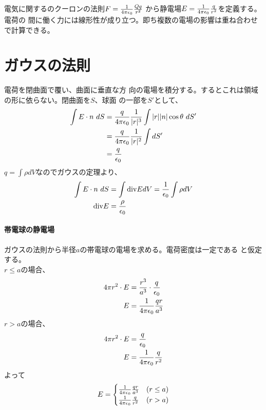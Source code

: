     電気に関するのクーロンの法則$F=\frac{1}{4\pi\epsilon_0}\frac{Qq}{r^2}$
    から静電場$E=\frac{1}{4\pi\epsilon_0}\frac{q}{r^2}$を定義する。電荷の
    間に働く力には線形性が成り立つ。即ち複数の電場の影響は重ね合わせで計算できる。
    \section{ガウスの法則}
        電荷を閉曲面で覆い、曲面に垂直な方
        向の電場を積分する。するとこれは領域の形に依らない。閉曲面を$S$、球面
        の一部を$S'$として、
        \begin{align*}
            \int E\cdot n\ dS &= \frac{q}{4\pi\epsilon_0}
            \frac{1}{|r|^3}\int |r||n|\cos\theta\ dS'\\
            &= \frac{q}{4\pi\epsilon_0}\frac{1}{|r|^2}\int dS'\\
            &= \frac{q}{\epsilon_0}
        \end{align*}
        $q = \int \rho dV$なのでガウスの定理より、
        \begin{align*}
            \int E\cdot n\ dS &= \int \mathrm{div} EdV = 
            \frac{1}{\epsilon_0}\int \rho dV\\
            \mathrm{div} E &= \frac{\rho}{\epsilon_0}
        \end{align*}
        \paragraph{帯電球の静電場}
            ガウスの法則から半径$a$の帯電球の電場を求める。電荷密度は一定である
            と仮定する。\\
            $r \le a$の場合、
            \begin{align*}
                4\pi r^2\cdot E &= \frac{r^3}{a^3}\cdot 
                \frac{q}{\epsilon_0}\\
                E &= \frac{1}{4\pi\epsilon_0}\frac{qr}{a^3}
            \end{align*}
            $r>a$の場合、
            \begin{align*}
                4\pi r^2\cdot E &= \frac{q}{\epsilon_0}\\
                E &= \frac{1}{4\pi\epsilon_0}\frac{q}{r^2}
            \end{align*}
            よって
                \[E = 
                \begin{cases}
                    \frac{1}{4\pi\epsilon_0}\frac{qr}{a^3} & (r \le a)\\
                    \frac{1}{4\pi\epsilon_0}\frac{q}{r^2} & (r>a)
                \end{cases}\]
